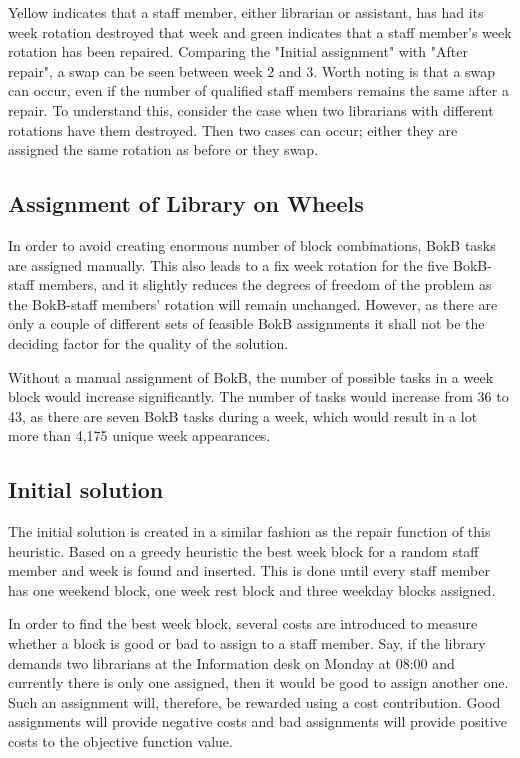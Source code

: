 Yellow indicates that a staff member, either librarian or assistant, has had its week rotation destroyed that week and green indicates that a staff member's week rotation has been repaired. Comparing the "Initial assignment" with "After repair", a swap can be seen between week 2 and 3. Worth noting is that a swap can occur, even if the number of qualified staff members remains the same after a repair. To understand this, consider the case when two librarians with different rotations have them destroyed. Then two cases can occur; either they are assigned the same rotation as before or they swap.


\subsection{Assignment of Library on Wheels} \label{BokB_assignment}
In order to avoid creating enormous number of block combinations, BokB tasks are assigned manually. This also leads to a fix week rotation for the five BokB-staff members, and it slightly reduces the degrees of freedom of the problem as the BokB-staff members' rotation will remain unchanged. However, as there are only a couple of different sets of feasible BokB assignments it shall not be the deciding factor for the quality of the solution.

Without a manual assignment of BokB, the number of possible tasks in a week block would increase significantly. The number of tasks would increase from 36 to 43, as there are seven BokB tasks during a week, which would result in a lot more than 4,175 unique week appearances. %

\subsection{Initial solution} \label{initial_solution}
The initial solution is created in a similar fashion as the repair function of this heuristic. Based on a greedy heuristic the best week block for a random staff member and week is found and inserted. This is done until every staff member has one weekend block, one week rest block and three weekday blocks assigned.

In order to find the best week block, several costs are introduced to measure whether a block is good or bad to assign to a staff member. Say, if the library demands two librarians at the Information desk on Monday at 08:00 and currently there is only one assigned, then it would be good to assign another one. Such an assignment will, therefore, be rewarded using a cost contribution. Good assignments will provide negative costs and bad assignments will provide positive costs to the objective function value.

